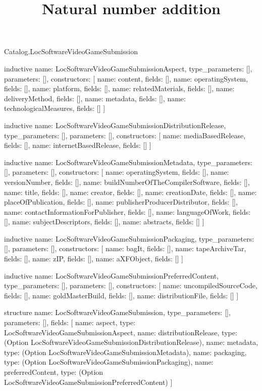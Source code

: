\begin{lexlean}{Catalog.LocSoftwareVideoGameSubmission}
\title{Natural number addition}
\begin{semanticmodule}
inductive{
  name: LocSoftwareVideoGameSubmissionAspect,
  type_parameters: [],
  parameters: [],
  constructors: [
    {name: content, fields: []},
    {name: operatingSystem, fields: []},
    {name: platform, fields: []},
    {name: relatedMaterials, fields: []},
    {name: deliveryMethod, fields: []},
    {name: metadata, fields: []},
    {name: technologicalMeasures, fields: []}
  ]
}

inductive{
  name: LocSoftwareVideoGameSubmissionDistributionRelease,
  type_parameters: [],
  parameters: [],
  constructors: [
    {name: mediaBasedRelease, fields: []},
    {name: internetBasedRelease, fields: []}
  ]
}

inductive{
  name: LocSoftwareVideoGameSubmissionMetadata,
  type_parameters: [],
  parameters: [],
  constructors: [
    {name: operatingSystem, fields: []},
    {name: versionNumber, fields: []},
    {name: buildNumberOfTheCompilerSoftware, fields: []},
    {name: title, fields: []},
    {name: creator, fields: []},
    {name: creationDate, fields: []},
    {name: placeOfPublication, fields: []},
    {name: publisherProducerDistributor, fields: []},
    {name: contactInformationForPublisher, fields: []},
    {name: languageOfWork, fields: []},
    {name: subjectDescriptors, fields: []},
    {name: abstracts, fields: []}
  ]
}

inductive{
  name: LocSoftwareVideoGameSubmissionPackaging,
  type_parameters: [],
  parameters: [],
  constructors: [
    {name: bagIt, fields: []},
    {name: tapeArchiveTar, fields: []},
    {name: zIP, fields: []},
    {name: aXFObject, fields: []}
  ]
}

inductive{
  name: LocSoftwareVideoGameSubmissionPreferredContent,
  type_parameters: [],
  parameters: [],
  constructors: [
    {name: uncompiledSourceCode, fields: []},
    {name: goldMasterBuild, fields: []},
    {name: distributionFile, fields: []}
  ]
}

structure{
  name: LocSoftwareVideoGameSubmission,
  type_parameters: [],
  parameters: [],
  fields: [
    {name: aspect, type: LocSoftwareVideoGameSubmissionAspect},
    {name: distributionRelease, type: (Option LocSoftwareVideoGameSubmissionDistributionRelease)},
    {name: metadata, type: (Option LocSoftwareVideoGameSubmissionMetadata)},
    {name: packaging, type: (Option LocSoftwareVideoGameSubmissionPackaging)},
    {name: preferredContent, type: (Option LocSoftwareVideoGameSubmissionPreferredContent)}
  ]
}
\end{semanticmodule}
\end{lexlean}

